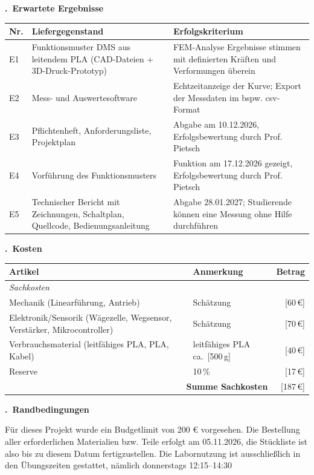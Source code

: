 \documentclass[11pt,a4paper]{article}
\newif\ifhinweise
\newcommand{\hinweis}[1]{\ifhinweise{\color{hinweisgrau}\small\itshape #1\par}\fi}
\newcommand{\feld}[1]{\leavevmode\textcolor{red!70!black}{[#1]}}
\newcounter{feldnr}
\newcommand{\formfeld}[1]{%
  \par\medskip\Needspace{6\baselineskip}\noindent
  \stepcounter{feldnr}%
  \colorbox{bhtgrau}{\parbox{\dimexpr\linewidth-2\fboxsep}{\textbf{\thefeldnr.\ #1}}}%
  \par\smallskip}
\begin{document}
\formfeld{Erwartete Ergebnisse}
\hinweis{Liefergegenstände = was am Ende übergeben wird. Erfolgskriterium = woran man prüft, dass es gut ist (möglichst messbar).}
\begin{tabularx}{\linewidth}{|l|X|X|}
\hline
\rowcolor{bhtgrau}\textbf{Nr.} & \textbf{Liefergegenstand} & \textbf{Erfolgskriterium} \\ \hline
E1 & Funktionsmuster DMS aus leitendem PLA (CAD-Dateien + 3D-Druck-Prototyp)& FEM-Analyse Ergebnisse stimmen mit definierten Kräften und Verformungen überein \\ \hline
E2 & Mess- und Auswertesoftware  & Echtzeitanzeige der Kurve; Export der Messdaten im bspw. csv-Format \\ \hline
E3 & Pflichtenheft, Anforderungsliste, Projektplan & Abgabe am 10.12.2026, Erfolgsbewertung durch Prof. Pietsch \\ \hline
E4 & Vorführung des Funktionsmusters & Funktion am 17.12.2026 gezeigt, Erfolgsbewertung durch Prof. Pietsch \\ \hline
E5 & Technischer Bericht mit Zeichnungen, Schaltplan, Quellcode, Bedienungsanleitung & Abgabe 28.01.2027; Studierende können eine Messung ohne Hilfe durchführen \\ \hline
\end{tabularx}

\formfeld{Kosten}
\begin{tabularx}{\linewidth}{|X|l|r|}
\hline
\rowcolor{bhtgrau}\textbf{Artikel} & \textbf{Anmerkung} & \textbf{Betrag} \\ \hline
\multicolumn{3}{|l|}{\textit{Sachkosten}} \\ \hline
Mechanik (Linearführung, Antrieb) & Schätzung & \feld{60\,€} \\ \hline
Elektronik/Sensorik (Wägezelle, Wegsensor, Verstärker, Mikrocontroller) & Schätzung & \feld{70\,€} \\ \hline
Verbrauchsmaterial (leitfähiges PLA, PLA, Kabel) & leitfähiges PLA ca.\ \feld{500\,g} & \feld{40\,€} \\ \hline
Reserve & 10\,\% & \feld{17\,€} \\ \hline
\multicolumn{2}{|r|}{\textbf{Summe Sachkosten}} & \feld{187\,€} \\ \hline
\end{tabularx}

\formfeld{Randbedingungen}
Für dieses Projekt wurde ein Budgetlimit von 200 € vorgesehen. Die Bestellung aller erforderlichen Materialien bzw. Teile
erfolgt am 05.11.2026, die Stückliste ist also bis zu diesem Datum fertigzustellen. Die Labornutzung ist ausschließlich in den
Übungszeiten gestattet, nämlich donnerstags 12:15--14:30
\end{document}

